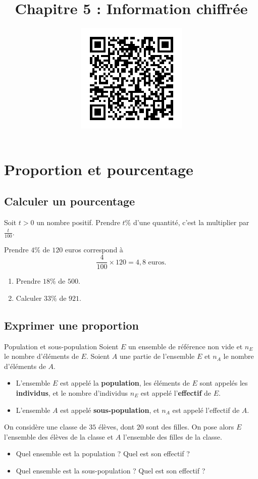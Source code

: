 \documentclass[11pt]{article}
\title{Chapitre 5 : Information chiffrée}
\date{\vspace{-14mm}
\href{https://erou.forge.aeif.fr/s11/information.html}{
  \includegraphics[scale=.6]{qrcode-information.png}}
\vspace{-12mm}}
\author{}
\begin{document}
\vspace{-2cm}
\maketitle\thispagestyle{fancy}

\section{Proportion et pourcentage}
\subsection{Calculer un pourcentage}
\begin{prop}
  Soit $t>0$ un nombre positif. Prendre $t\%$ d'une quantité, c'est la
  multiplier par
  \(
    \frac{t}{100}.
  \)
\end{prop}
\begin{exemple}
  Prendre $4\%$ de $120$ euros correspond à
  \[
    \frac{4}{100}\times 120 = 4,8\text{ euros.}
  \]
\end{exemple}
\begin{app}
  \begin{enumerate}
    \item Prendre $18\%$ de $500$.
    \item Calculer $33\%$ de $921$.
  \end{enumerate}
\end{app}

\subsection{Exprimer une proportion}
\begin{defi}{Population et sous-population}
  Soient $E$ un ensemble de référence non vide et $n_E$ le nombre d'éléments de
  $E$. Soient $A$ une partie de l'ensemble $E$ et $n_A$ le nombre d'éléments de
  $A$.
  \begin{itemize}
    \item L'ensemble $E$ est appelé la \textbf{population}, les éléments de $E$
      sont appelés les \textbf{individus}, et le nombre d'individus $n_E$ est
      appelé l'\textbf{effectif} de $E$.
    \item L'ensemble $A$ est appelé \textbf{sous-population}, et $n_A$ est
      appelé l'effectif de $A$.
  \end{itemize}
\end{defi}
\begin{app}
  On considère une classe de $35$ élèves, dont $20$ sont des filles. On pose
  alors $E$ l'ensemble des élèves de la classe et $A$ l'ensemble des filles de
  la classe.
  \begin{itemize}
    \item Quel ensemble est la population ? Quel est son effectif ?
    \item Quel ensemble est la sous-population ? Quel est son effectif ?
  \end{itemize}
\end{app}
\end{document}

